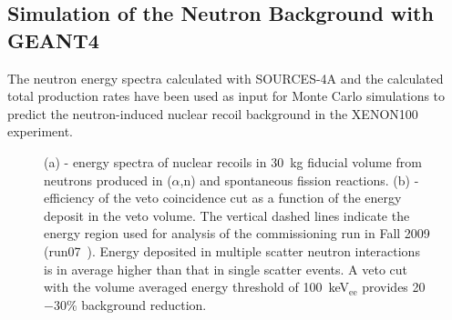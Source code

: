 \subsection{Simulation of the Neutron Background with GEANT4}
\label{secNRalphaN_GEANT4}

The neutron energy spectra calculated with SOURCES-4A and the calculated total production rates have been used as input for Monte Carlo simulations to predict the neutron-induced nuclear recoil background in the XENON100 experiment. 

\begin{figure}[!b]
\centering
{}
\caption[Energy spectra of nuclear recoils from neutrons produced in ($\alpha$,n) and spontaneous fission reactions, and efficiency of the veto coincidence cut as a function of the energy deposit in the veto volume]{(a) - energy spectra of nuclear recoils in 30~kg fiducial volume from neutrons produced in ($\alpha$,n) and spontaneous fission reactions. (b) - efficiency of the veto coincidence cut as a function of the energy deposit in the veto volume. The vertical dashed lines indicate the energy region used for analysis of the commissioning run in Fall 2009 (run07~\cite{xe100-run07}). Energy deposited in multiple scatter neutron interactions is in average higher than that in single scatter events. A veto cut with the volume averaged energy threshold of 100~keV$_{\mathrm{ee}}$ provides 20$-$30\% background reduction.}
\label{figAlphaNspectraSM}
\end{figure}

